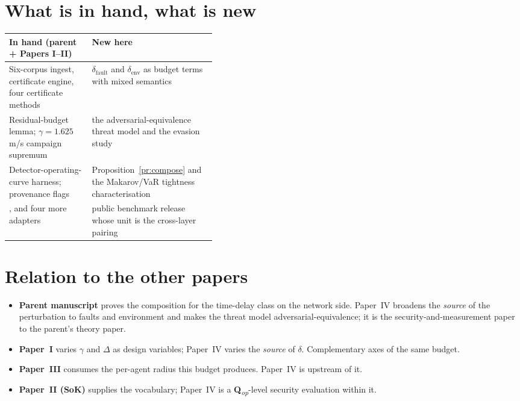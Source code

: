 \documentclass[11pt,a4paper]{article}
\newcommand{\dfault}{\delta_{\mathrm{fault}}}
\newcommand{\denv}{\delta_{\mathrm{env}}}
\newcommand{\Qlvl}[1]{\textbf{Q}\textsubscript{\textit{#1}}}
\newcommand{\Qop}{\Qlvl{op}}
\begin{document}
\section{What is in hand, what is new}
\begin{center}\small
\begin{tabularx}{\linewidth}{@{}P{0.40\linewidth}Y@{}}
\toprule
\textbf{In hand (parent + Papers I--II)} & \textbf{New here} \\
\midrule
Six-corpus ingest, certificate engine, four certificate methods &
$\dfault$ and $\denv$ as budget terms with mixed semantics \\
Residual-budget lemma; $\gamma=1.625$\,m/s campaign supremum &
the adversarial-equivalence threat model and the evasion study \\
Detector-operating-curve harness; provenance flags &
Proposition~\ref{pr:compose} and the Makarov/VaR tightness characterisation \\
,  and four more adapters &
public benchmark release whose unit is the cross-layer pairing \\
\bottomrule
\end{tabularx}
\end{center}

\section{Relation to the other papers}
\begin{itemize}
\item \textbf{Parent manuscript} proves the composition for the time-delay class
  on the network side. Paper~IV broadens the \emph{source} of the perturbation to
  faults and environment and makes the threat model adversarial-equivalence; it
  is the security-and-measurement paper to the parent's theory paper.
\item \textbf{Paper~I} varies $\gamma$ and $\Delta$ as design variables; Paper~IV
  varies the \emph{source} of $\delta$. Complementary axes of the same budget.
\item \textbf{Paper~III} consumes the per-agent radius this budget produces.
  Paper~IV is upstream of it.
\item \textbf{Paper~II (SoK)} supplies the vocabulary; Paper~IV is a \Qop{}-level
  security evaluation within it.
\end{itemize}
\end{document}
